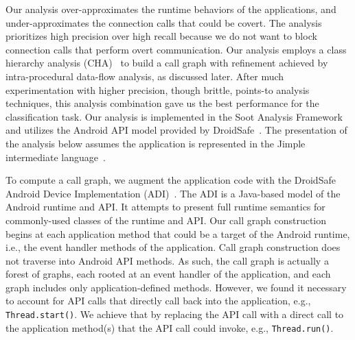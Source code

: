 Our analysis over-approximates the runtime behaviors of the
applications, and under-approximates the connection calls that could
be covert.  The analysis prioritizes high precision over high recall
because we do not want to block connection calls that perform overt
communication. Our analysis employs a class hierarchy analysis
(CHA)~\cite{Dean1995} to build a call graph with refinement achieved
by intra-procedural data-flow analysis, as discussed later.  After much
experimentation with higher precision, though brittle, points-to
analysis techniques, this analysis combination gave us the best
performance for the classification task.  Our analysis is implemented
in the Soot Analysis Framework~\cite{Vallee-Rai2000} and utilizes the
Android API model provided by
DroidSafe~\cite{Gordon:Kim:Perkins:Gilham:Nguyen:Rinard:NDSS15}. The
presentation of the analysis below assumes the application is
represented in the Jimple intermediate language~\cite{Vallee-Rai2000}.

To compute a call graph, we augment the application code with the
DroidSafe Android Device Implementation
(ADI)~\cite{Gordon:Kim:Perkins:Gilham:Nguyen:Rinard:NDSS15}.  The ADI
is a Java-based model of the Android runtime and API. It attempts to
present full runtime semantics for commonly-used classes of the
runtime and API.  Our call graph construction begins at each
application method that could be a target of the Android runtime, i.e., 
the event handler methods of the application.  Call graph
construction does not traverse into Android API methods. 
As such, the call
graph is actually a forest of graphs, each rooted at an event
handler of the application, and each graph includes only
application-defined methods.  However, we found it necessary to
account for API calls that directly call back into the application,
e.g., \lstinline!Thread.start()!. We achieve that by replacing the API call with a
direct call to the application method(s) that the API call could
invoke, e.g., \lstinline!Thread.run()!.



